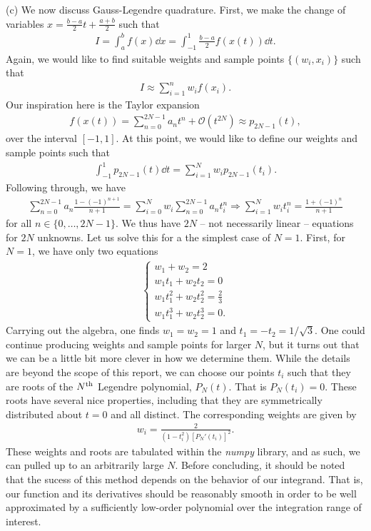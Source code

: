 {(c) We now discuss Gauss-Legendre quadrature.
First, we make the change of variables $x = \frac{b-a}{2} t + \frac{a+b}{2}$ such that
\begin{align}
    I = \int_{a}^{b} f(x) \dd{x} = \int_{-1}^{1} \frac{b-a}{2} f(x(t)) \dd{t}
.\end{align}
Again, we would like to find suitable weights and sample points $\{ (w_{i},x_{i}) \}$ such that
\begin{align}
    I \approx \sum_{i=1}^{n} w_{i} f(x_{i})
.\end{align}
Our inspiration here is the Taylor expansion
\begin{align}
    f(x(t)) = \sum_{n=0}^{2N-1} a_{n} t^{n} + \mathcal{O}(t^{2N}) \approx p_{2N-1}(t)
,\end{align}
over the interval $[-1,1]$.
At this point, we would like to define our weights and sample points such that 
\begin{align}
    \int_{-1}^{1} p_{2N-1}(t) \dd{t} = \sum_{i=1}^{N} w_{i} p_{2N-1}(t_{i})
.\end{align}
Following through, we have
\begin{gather}
    \sum_{n=0}^{2N-1} a_{n} \frac{1 - (-1)^{n+1}}{n+1} = \sum_{i=0}^{N} w_{i} \sum_{n=0}^{2N-1} a_{n} t_{i}^{n} \Rightarrow
    \sum_{i=1}^{N} w_{i} t_{i}^{n} = \frac{1 + (-1)^{n}}{n+1}
\end{gather}
for all $n \in \{0,\ldots,2N-1\}$.
We thus have $2N$ -- not necessarily linear -- equations for $2N$ unknowns.
Let us solve this for a the simplest case of $N = 1$.
First, for $N = 1$, we have only two equations
\begin{align}
    \begin{cases}
        w_1 + w_2 = 2 \\
        w_1 t_1 + w_2 t_2 = 0 \\
        \displaystyle w_1 t_1^2 + w_2 t_2^2 = \frac{2}{3} \\
        w_1 t_1^3 + w_2 t_2^3 = 0
    .\end{cases}
\end{align}
Carrying out the algebra, one finds $w_{1} = w_{2} = 1$ and $t_{1} = -t_{2} = 1/\sqrt{3}$.
One could continue producing weights and sample points for larger $N$, but it turns out that we can be a little bit more clever in how we determine them.
While the details are beyond the scope of this report, we can choose our points $t_{i}$ such that they are roots of the $N^{\rm th}$ Legendre polynomial, $P_{N}(t)$.
That is $P_{N}(t_{i}) = 0$.
These roots have several nice properties, including that they are symmetrically distributed about $t = 0$ and all distinct.
The corresponding weights are given by
\begin{align}
    w_{i} = \frac{2}{(1 - t_{i}^2) [P_{N}'(t_{i})]^2}
.\end{align}
These weights and roots are tabulated within the \textit{numpy} library, and as such, we can pulled up to an arbitrarily large $N$.
Before concluding, it should be noted that the sucess of this method depends on the behavior of our integrand.
That is, our function and its derivatives should be reasonably smooth in order to be well approximated by a sufficiently low-order polynomial over the integration range of interest.


}


